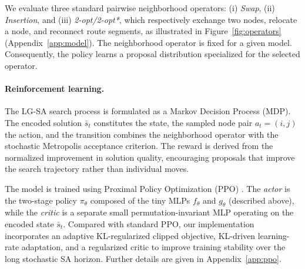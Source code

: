 \documentclass[letterpaper]{article} %
\begin{document}
We evaluate three standard pairwise neighborhood operators: (i) \textit{Swap}, (ii) \textit{Insertion}, and (iii) \textit{2-opt/2-opt*}, which respectively exchange two nodes, relocate a node, and reconnect route segments, as illustrated in Figure~\ref{fig:operators} (Appendix~\ref{app:model}). The neighborhood operator is fixed for a given model. Consequently, the policy learns a proposal distribution specialized for the selected operator.







\paragraph{Reinforcement learning.}
The LG-SA search process is formulated as a Markov Decision Process (MDP). The encoded solution $\bar{s}_t$ constitutes the state, the sampled node pair $a_t=(i,j)$ the action, and the transition combines the neighborhood operator with the stochastic Metropolis acceptance criterion. The reward is derived from the normalized improvement in solution quality, encouraging proposals that improve the search trajectory rather than individual moves.

The model is trained using Proximal Policy Optimization (PPO) \citep{schulman_proximal_2017}. The \textit{actor} is the two-stage policy $\pi_\theta$ composed of the tiny MLPs $f_\theta$ and $g_\theta$ (described above), while the \textit{critic} is a separate small permutation-invariant MLP operating on the encoded state $\bar s_t$. Compared with standard PPO, our implementation incorporates an adaptive KL-regularized clipped objective, KL-driven learning-rate adaptation, and a regularized critic to improve training stability over the long stochastic SA horizon. Further details are given in Appendix~\ref{app:ppo}.
\end{document}
